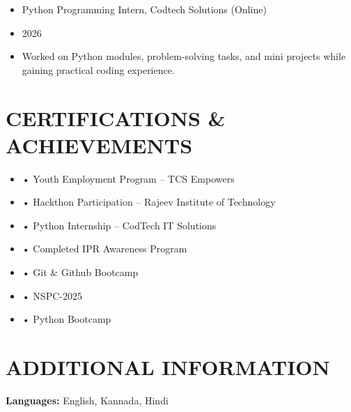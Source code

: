 \documentclass[10pt,a4paper]{article}
\begin{document}
\begin{itemize}[leftmargin=*]
    \item Python Programming Intern, Codtech Solutions (Online)
    \item 2026
    \item Worked on Python modules, problem-solving tasks, and mini projects while gaining practical coding experience.
\end{itemize}



\section*{CERTIFICATIONS \& ACHIEVEMENTS}

\begin{itemize}[leftmargin=*]
    \item • Youth Employment Program – TCS Empowers
    \item • Hackthon Participation – Rajeev Institute of Technology
    \item • Python Internship – CodTech IT Solutions
    \item • Completed IPR Awareness Program
    \item • Git \& Github Bootcamp
    \item • NSPC-2025
    \item • Python Bootcamp
\end{itemize}



\section*{ADDITIONAL INFORMATION}

\textbf{Languages:} English, Kannada, Hindi
\end{document}
